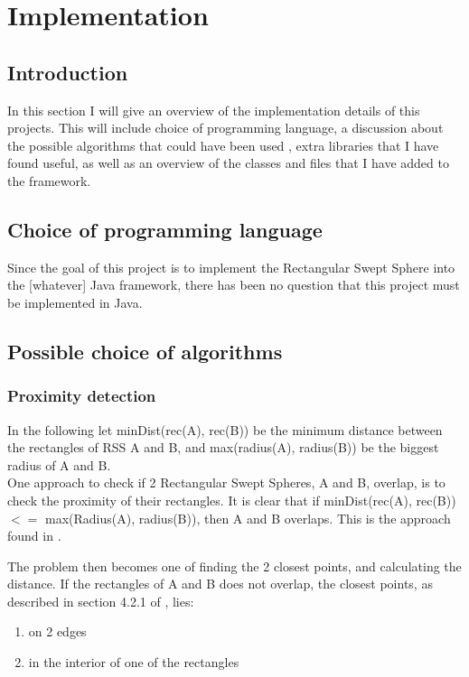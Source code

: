 
\section{Implementation}
\label{implementation}

\subsection{Introduction}
In this section I will give an overview of the implementation details of this projects. This will include choice of programming language, a discussion about the possible algorithms that could have been used , extra libraries that I have found useful, as well as an overview of the classes and files that I have added to the framework.

\subsection{Choice of programming language}
Since the goal of this project is to implement the Rectangular Swept Sphere into the [whatever]  Java framework, there has been no question that this project must be implemented in Java.

\subsection{Possible choice of algorithms}
\subsubsection{Proximity detection}
In the following let minDist(rec(A), rec(B)) be the minimum distance between the rectangles of RSS A and B, and max(radius(A), radius(B)) be the biggest radius of A and B.\\

One approach to check if 2 Rectangular Swept Spheres, A and B, overlap, is to check the proximity of their rectangles. It is clear that if minDist(rec(A), rec(B)) $<=$ max(Radius(A), radius(B)), then A and B overlaps. This is the approach found in \cite{Larsen99fastproximity}.

The problem then becomes one of finding the 2 closest points, and calculating the distance.
If the rectangles of A and B does not overlap, the closest points, as described in section 4.2.1 of \cite{Larsen9fastproximity}, lies:
\begin{enumerate}
\item on 2 edges
\item in the interior of one of the rectangles
\end{enumerate}

